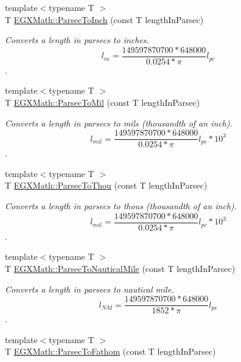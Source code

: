 \begin{DoxyCompactItemize}
{\footnotesize template$<$typename T $>$ }\\T \mbox{\hyperlink{group___e_g_x_math-_conversions-_length_conversions-_astronomical-_parsec-_imperial_gaebc7c4ce22fe7ae0ae26420284598c29}{E\+G\+X\+Math\+::\+Parsec\+To\+Inch}} (const T length\+In\+Parsec)
\begin{DoxyCompactList}\small\item\em Converts a length in parsecs to inches. \[ l_{in}= \frac{149597870700 * 648000}{0.0254 * \pi} l_{pc} \]. \end{DoxyCompactList}\item 
{\footnotesize template$<$typename T $>$ }\\T \mbox{\hyperlink{group___e_g_x_math-_conversions-_length_conversions-_astronomical-_parsec-_imperial_ga7ff283e88a975e05bd987930e8b3cbf2}{E\+G\+X\+Math\+::\+Parsec\+To\+Mil}} (const T length\+In\+Parsec)
\begin{DoxyCompactList}\small\item\em Converts a length in parsecs to mils (thousandth of an inch). \[ l_{mil}= \frac{149597870700 * 648000}{0.0254 * \pi} l_{pc} * 10^{3} \]. \end{DoxyCompactList}\item 
{\footnotesize template$<$typename T $>$ }\\T \mbox{\hyperlink{group___e_g_x_math-_conversions-_length_conversions-_astronomical-_parsec-_imperial_ga0e473cc0d93ca332b9fc42ed6f8d73c6}{E\+G\+X\+Math\+::\+Parsec\+To\+Thou}} (const T length\+In\+Parsec)
\begin{DoxyCompactList}\small\item\em Converts a length in parsecs to thous (thousandth of an inch). \[ l_{mil}= \frac{149597870700 * 648000}{0.0254 * \pi} l_{pc} * 10^{3} \]. \end{DoxyCompactList}\item 
{\footnotesize template$<$typename T $>$ }\\T \mbox{\hyperlink{group___e_g_x_math-_conversions-_length_conversions-_astronomical-_parsec-_nautical_ga34adb714e6f4da104b25e2b5a2ab114e}{E\+G\+X\+Math\+::\+Parsec\+To\+Nautical\+Mile}} (const T length\+In\+Parsec)
\begin{DoxyCompactList}\small\item\em Converts a length in parsecs to nautical mile. \[ l_{NM}= \frac{149597870700 * 648000}{1852 * \pi} l_{pc} \]. \end{DoxyCompactList}\item 
{\footnotesize template$<$typename T $>$ }\\T \mbox{\hyperlink{group___e_g_x_math-_conversions-_length_conversions-_astronomical-_parsec-_nautical_gab621169a5b3794b8405b4b0bca2b6092}{E\+G\+X\+Math\+::\+Parsec\+To\+Fathom}} (const T length\+In\+Parsec)

\end{DoxyCompactItemize}
